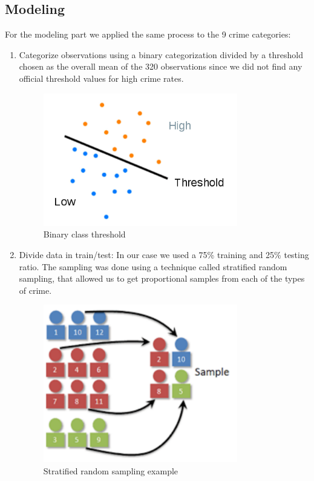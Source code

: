 \documentclass[12pt, openany]{report}
\begin{document}
\subsection{Modeling}

For the modeling part we applied the same process to the 9 crime categories:

\begin{enumerate}

\item Categorize observations using a binary categorization divided by a threshold chosen as the overall mean of the 320 observations since we did not find any official threshold values for high crime rates.

\begin{figure}[h!]
\centering
        \includegraphics[width=0.8\textwidth]{images/threshold.png}
        \caption{Binary class threshold}
\end{figure}

\item Divide data in train/test: In our case we used a 75\% training and 25\% testing ratio. The sampling was done using a technique called stratified random sampling, that allowed us to get proportional samples from each of the types of crime.

\begin{figure}[h!]
\centering
        \includegraphics[width=0.8\textwidth]{images/strata_sample.png}
        \caption{Stratified random sampling example}
\end{figure}


\end{enumerate}
\end{document}
